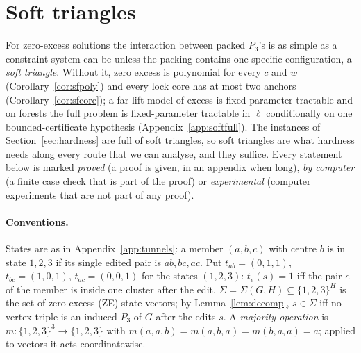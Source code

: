 \section{Soft triangles}\label{sec:soft}
For zero-excess solutions the interaction between packed $P_3$'s is as simple as a constraint system can be unless the packing contains one specific configuration, a \emph{soft triangle}. Without it, zero excess is polynomial for every $c$ and $w$ (Corollary~\ref{cor:sfpoly}) and every lock core has at most two anchors (Corollary~\ref{cor:sfcore}); a far-lift model of excess is fixed-parameter tractable and on forests the full problem is fixed-parameter tractable in $\ell$ conditionally on one bounded-certificate hypothesis (Appendix~\ref{app:softfull}). The instances of Section~\ref{sec:hardness} are full of soft triangles, so soft triangles are what hardness needs along every route that we can analyse, and they suffice. Every statement below is marked \emph{proved} (a proof is given, in an appendix when long), \emph{by computer} (a finite case check that is part of the proof) or \emph{experimental} (computer experiments that are not part of any proof).
\paragraph{Conventions.} States are as in Appendix~\ref{app:tunnels}: a member $(a,b,c)$ with centre $b$ is in state $1,2,3$ if its single edited pair is $ab,bc,ac$. Put $t_{ab}=(0,1,1)$, $t_{bc}=(1,0,1)$, $t_{ac}=(0,0,1)$ for the states $(1,2,3)$: $t_e(s)=1$ iff the pair $e$ of the member is inside one cluster after the edit. $\Sigma=\Sigma(G,H)\subseteq\{1,2,3\}^H$ is the set of zero-excess (ZE) state vectors; by Lemma~\ref{lem:decomp}, $s\in\Sigma$ iff no vertex triple is an induced $P_3$ of $G$ after the edits $s$. A \emph{majority operation} is $m:\{1,2,3\}^3\to\{1,2,3\}$ with $m(a,a,b)=m(a,b,a)=m(b,a,a)=a$; applied to vectors it acts coordinatewise.

